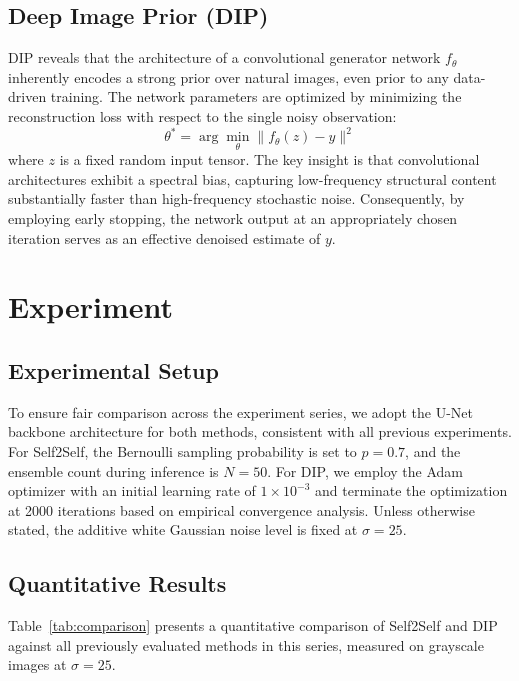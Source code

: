 \documentclass[twocolumn, a4paper, 10pt]{article}
\begin{document}
\subsection{Deep Image Prior (DIP)}

DIP \cite{b2} reveals that the architecture of a convolutional generator network $f_\theta$ inherently encodes a strong prior over natural images, even prior to any data-driven training. The network parameters are optimized by minimizing the reconstruction loss with respect to the single noisy observation:
\begin{equation}
    \theta^* = \arg\min_\theta \| f_\theta(z) - y \|^2
\end{equation}
where $z$ is a fixed random input tensor. The key insight is that convolutional architectures exhibit a spectral bias, capturing low-frequency structural content substantially faster than high-frequency stochastic noise. Consequently, by employing early stopping, the network output at an appropriately chosen iteration serves as an effective denoised estimate of $y$.

\section{Experiment}

\subsection{Experimental Setup}

To ensure fair comparison across the experiment series, we adopt the U-Net backbone architecture for both methods, consistent with all previous experiments. For Self2Self, the Bernoulli sampling probability is set to $p=0.7$, and the ensemble count during inference is $N=50$. For DIP, we employ the Adam optimizer with an initial learning rate of $1 \times 10^{-3}$ and terminate the optimization at 2000 iterations based on empirical convergence analysis. Unless otherwise stated, the additive white Gaussian noise level is fixed at $\sigma=25$.

\subsection{Quantitative Results}

Table~\ref{tab:comparison} presents a quantitative comparison of Self2Self and DIP against all previously evaluated methods in this series, measured on grayscale images at $\sigma=25$.
\end{document}
